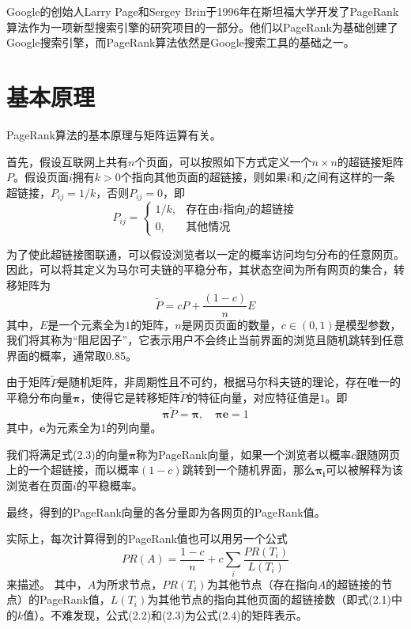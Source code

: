 \documentclass[UTF8,openany]{ctexbook}
\begin{document}
Google的创始人Larry Page和Sergey Brin于1996年在斯坦福大学开发了PageRank算法作为一项新型搜索引擎的研究项目的一部分。他们以PageRank为基础创建了Google搜索引擎，而PageRank算法依然是Google搜索工具的基础之一。

\section[基本原理]{基本原理}

PageRank算法的基本原理与矩阵运算有关。

首先，假设互联网上共有$n$个页面，可以按照如下方式定义一个$n \times n$的超链接矩阵$P$。假设页面$i$拥有$k>0$个指向其他页面的超链接，则如果$i$和$j$之间有这样的一条超链接，$P_{ij}=1/k$，否则$P_{ij}=0$，即
\begin{equation}
    P_{ij}=\begin{cases}
        1/k, & \text{存在由$i$指向$j$的超链接} \\
        0,   & \text{其他情况}
    \end{cases}
\end{equation}

为了使此超链接图联通，可以假设浏览者以一定的概率访问均匀分布的任意网页。因此，可以将其定义为马尔可夫链的平稳分布，其状态空间为所有网页的集合，转移矩阵为
\begin{equation}
    \widetilde{P}=cP+\frac{(1-c)}{n}E
\end{equation}
其中，$E$是一个元素全为$1$的矩阵，$n$是网页页面的数量，$c \in (0,1)$是模型参数，我们将其称为“阻尼因子”，它表示用户不会终止当前界面的浏览且随机跳转到任意界面的概率，通常取0.85\cite{bi:G}。

由于矩阵$\widetilde{P}$是随机矩阵，非周期性且不可约，根据马尔科夫链的理论\cite{bi:RA}，存在唯一的平稳分布向量$\boldsymbol{\pi}$，使得它是转移矩阵$\widetilde{P}$的特征向量，对应特征值是$1$\cite{bi:DGPOLS}。即
\begin{equation}
    \boldsymbol{\pi} \widetilde{P}=\boldsymbol{\pi},\quad\boldsymbol{\pi}\boldsymbol{e}=1
\end{equation}
其中，$\boldsymbol{e}$为元素全为1的列向量。

我们将满足式(2.3)的向量$\boldsymbol{\pi}$称为PageRank向量，如果一个浏览者以概率$c$跟随网页上的一个超链接，而以概率$(1-c)$跳转到一个随机界面，那么$\boldsymbol{\pi_i}$可以被解释为该浏览者在页面$i$的平稳概率。

最终，得到的PageRank向量的各分量即为各网页的PageRank值。

实际上，每次计算得到的PageRank值也可以用另一个公式
\begin{equation}
    PR(A)=\frac{1-c}{n} + c\sum_i \frac{PR(T_i)}{L(T_i)}
\end{equation}
来描述。
其中，$A$为所求节点，$PR(T_i)$为其他节点（存在指向$A$的超链接的节点）的PageRank值，$L(T_i)$为其他节点的指向其他页面的超链接数（即式(2.1)中的$k$值）。不难发现，公式(2.2)和(2.3)为公式(2.4)的矩阵表示。
\end{document}
